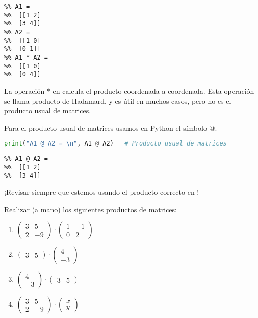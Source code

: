 \begin{verbatim}
%% A1 =
%%  [[1 2]
%%  [3 4]]
%% A2 =
%%  [[1 0]
%%  [0 1]]
%% A1 * A2 =
%%  [[1 0]
%%  [0 4]]
\end{verbatim}

La operación $*$ en \python calcula el producto coordenada a coordenada. Esta operación se llama producto de Hadamard, y es útil en muchos casos, pero no es el producto usual de matrices.

Para el producto usual de matrices usamos en Python el símbolo @.

\begin{Shaded}
\begin{lstlisting}[language=Python]
print("A1 @ A2 = \n", A1 @ A2)   # Producto usual de matrices
\end{lstlisting}
\end{Shaded}

\begin{verbatim}
%% A1 @ A2 =
%%  [[1 2]
%%  [3 4]]
\end{verbatim}

¡Revisar siempre que estemos usando el producto correcto en \python!

\begin{ejercicio} \label{ejer:productos}
Realizar (a mano) los siguientes productos de matrices:
\begin{enumerate}
\item  $\begin{pmatrix}3&5\\ 2 & -9 \end{pmatrix} \cdot \begin{pmatrix}1&-1\\ 0 & 2 \end{pmatrix}$
\item  $\begin{pmatrix}3&5\end{pmatrix} \cdot \begin{pmatrix}4\\ -3\end{pmatrix}$
\item  $\begin{pmatrix}4\\ -3\end{pmatrix} \cdot \begin{pmatrix}3&5\end{pmatrix}$
\item \label{item:sistema}  $\begin{pmatrix}3&5\\ 2 & -9 \end{pmatrix} \cdot \begin{pmatrix}x\\ y \end{pmatrix}$
\end{enumerate}
\end{ejercicio}

